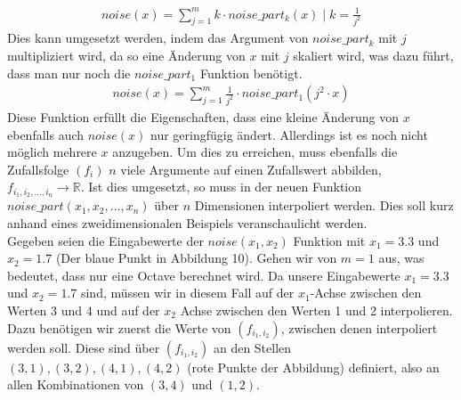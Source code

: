 \documentclass[11pt,a4paper]{article}
\begin{document}
\begin{align}
noise(x) = \sum^{m}_{j=1} k \cdot noise\_part_{k}(x) \mid k = \frac{1}{j^2}
\end{align}
\noindent
Dies kann umgesetzt werden, indem das Argument von $noise\_part_k$ mit $j$ multipliziert wird, da so eine Änderung von $x$ mit $j$ skaliert wird, was dazu führt, dass man nur noch die $noise\_part_1$ Funktion benötigt.
\begin{align}
noise(x) = \sum^{m}_{j=1}  \frac{1}{j^2} \cdot noise\_part_1(j^2 \cdot x)
\end{align}
\noindent
Diese Funktion erfüllt die Eigenschaften, dass eine kleine Änderung von $x$ ebenfalls auch $noise(x)$ nur geringfügig ändert. Allerdings ist es noch nicht möglich mehrere $x$ anzugeben. Um dies zu erreichen, muss ebenfalls die Zufallsfolge $(f_i)$ $n$ viele Argumente auf einen Zufallswert abbilden, $f_{i_1, i_2, ..., i_n} \rightarrow \mathbb{R}$. Ist dies umgesetzt, so muss in der neuen Funktion $noise\_part(x_1, x_2, ..., x_n)$ über $n$ Dimensionen interpoliert werden. Dies soll kurz anhand eines zweidimensionalen Beispiels veranschaulicht werden.\\
Gegeben seien die Eingabewerte der $noise(x_1, x_2)$ Funktion mit $x_1=3.3$ und $x_2 = 1.7$ (Der blaue Punkt in Abbildung 10). Gehen wir von $m = 1$ aus, was bedeutet, dass nur eine Octave berechnet wird. Da unsere Eingabewerte $x_1 = 3.3$ und $x_2 = 1.7$ sind, müssen wir in diesem Fall auf der $x_1$-Achse zwischen den Werten 3 und 4 und auf der $x_2$ Achse zwischen den Werten 1 und 2 interpolieren. Dazu benötigen wir zuerst die Werte von $(f_{i_1, i_2})$, zwischen denen interpoliert werden soll. Diese sind über $(f_{i_1, i_2})$ an den Stellen $(3, 1), (3, 2), (4, 1), (4, 2)$ (rote Punkte der Abbildung) definiert, also an allen Kombinationen von $(3,4)$ und $(1,2)$.\\
\end{document}
